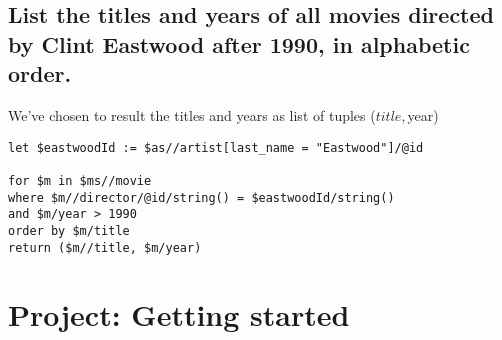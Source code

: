 \documentclass{article}
\begin{document}
\subsection{ List the titles and years of all movies directed by Clint
  Eastwood after 1990, in alphabetic order.  }

We've chosen to result the titles and years as list of tuples ($title, $year)
\begin{verbatim}
let $eastwoodId := $as//artist[last_name = "Eastwood"]/@id

for $m in $ms//movie
where $m//director/@id/string() = $eastwoodId/string()
and $m/year > 1990
order by $m/title
return ($m//title, $m/year)
\end{verbatim}

\section{Project: Getting started}
\end{document}

